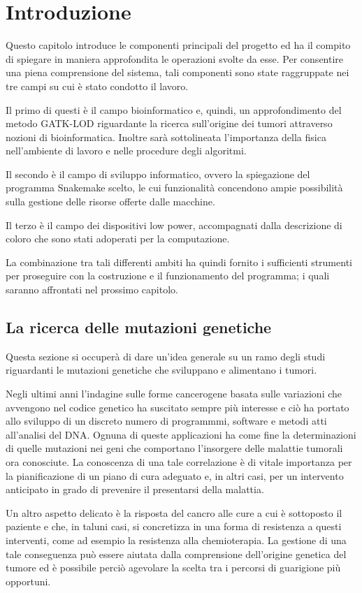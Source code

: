 \chapter{Introduzione}
Questo capitolo introduce le componenti principali del progetto ed ha il compito di spiegare in maniera approfondita le operazioni svolte da esse.
Per consentire una piena comprensione del sistema, tali componenti sono state raggruppate nei tre campi su cui è stato condotto il lavoro.

Il primo di questi è il campo bioinformatico e, quindi, un approfondimento del metodo GATK-LOD riguardante la ricerca sull'origine dei tumori attraverso nozioni di bioinformatica.
Inoltre sarà sottolineata l'importanza della fisica nell'ambiente di lavoro e nelle procedure degli algoritmi.

Il secondo è il campo di sviluppo informatico, ovvero la spiegazione del programma Snakemake scelto, le cui funzionalità concendono ampie possibilità sulla gestione delle risorse offerte dalle macchine.

Il terzo è il campo dei dispositivi low power, accompagnati dalla descrizione di coloro che sono stati adoperati per la computazione.

La combinazione tra tali differenti ambiti ha quindi fornito i sufficienti strumenti per proseguire con la costruzione e il funzionamento del programma; i quali saranno affrontati nel prossimo capitolo.


\section{La ricerca delle mutazioni genetiche}
Questa sezione si occuperà di dare un'idea generale su un ramo degli studi riguardanti le mutazioni genetiche che sviluppano e alimentano i tumori.

Negli ultimi anni l'indagine sulle forme cancerogene basata sulle variazioni che avvengono nel codice genetico ha suscitato sempre più interesse e ciò ha portato allo sviluppo di un discreto numero di programmmi, software e metodi atti all'analisi del DNA.
Ognuna di queste applicazioni ha come fine la determinazioni di quelle mutazioni nei geni che comportano l'insorgere delle malattie tumorali ora conosciute.
La conoscenza di una tale correlazione è di vitale importanza per la pianificazione di un piano di cura adeguato e, in altri casi, per un intervento anticipato in grado di prevenire il presentarsi della malattia.

Un altro aspetto delicato è la risposta del cancro alle cure a cui è sottoposto il paziente e che, in taluni casi, si concretizza in una forma di resistenza a questi interventi, come ad esempio la resistenza alla chemioterapia.
La gestione di una tale conseguenza può essere aiutata dalla comprensione dell'origine genetica del tumore ed è possibile perciò agevolare la scelta tra i percorsi di guarigione più opportuni.

